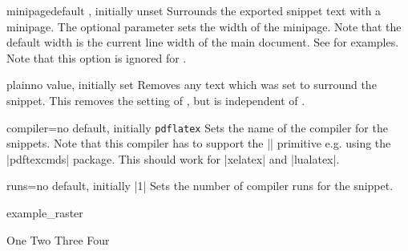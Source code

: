 

\begin{extTcbKey}[][doc new=2015-03-11]{minipage}{}{default \texttt{},
  initially unset}
Surrounds the exported snippet text with a minipage. The optional 
parameter sets the width of the minipage. Note that the default width is the
current line width of the main document.
See  for examples.
Note that this option is ignored for .
\end{extTcbKey}


\begin{extTcbKey}[][doc new=2015-03-11]{plain}{}{no value, initially set}
  Removes any text which was set to surround the snippet.
  This removes the setting of  , but is
  independent of .
\end{extTcbKey}


\begin{extTcbKey}[][doc new=2015-03-11]{compiler}{=}{no default,
  initially \texttt{pdflatex}}
  Sets the name of the compiler for the snippets. Note that this compiler
  has to support the |\pdfmdfivesum| primitive e.g. using the
  |pdftexcmds| package. This should work for |xelatex| and |lualatex|.
\end{extTcbKey}

\begin{extTcbKey}[][doc new=2015-03-11]{runs}{=}{no default,
  initially |1|}
  Sets the number of compiler runs for the snippet.
\begin{dispExample}
\begin{tcbexternal}[minipage,runs=2]{example_raster}
  \begin{tcbitemize}[raster equal height,
      size=small,colframe=red!50!black,colback=red!10!white]
    \tcbitem One
    \tcbitem \Huge Two
    \tcbitem Three
    \tcbitem Four
  \end{tcbitemize}
\end{tcbexternal}
\end{dispExample}
\end{extTcbKey}

